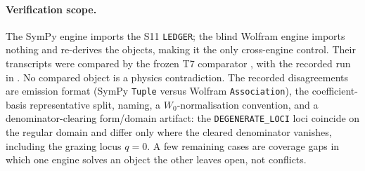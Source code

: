 \paragraph{Verification scope.}
The SymPy engine imports the S11 \texttt{LEDGER}; the blind Wolfram engine
imports nothing and re-derives the objects, making it the only cross-engine
control. Their transcripts were compared by the frozen T7 comparator
,
with the recorded run in
.
No compared object is a physics contradiction. The recorded disagreements are
emission format (SymPy \texttt{Tuple} versus Wolfram \texttt{Association}),
the coefficient-basis representative split, naming, a \(W_0\)-normalisation
convention, and a denominator-clearing form/domain artifact: the
\texttt{DEGENERATE\_LOCI} loci coincide on the regular domain and differ only
where the cleared denominator vanishes, including the grazing locus \(q=0\).
A few remaining cases are coverage gaps in which one engine solves an object
the other leaves open, not conflicts.

